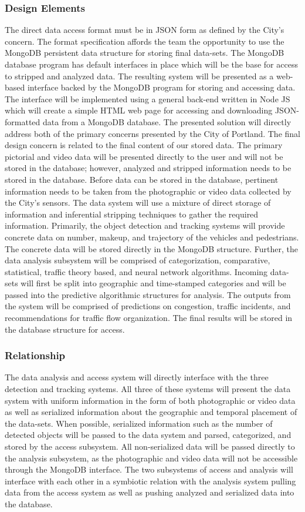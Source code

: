 \documentclass[onecolumn, draftclsnofoot,10pt, compsoc]{IEEEtran}
\begin{document}
\subsubsection{Design Elements}
The direct data access format must be in JSON form as defined by the City's concern. The format specification affords the team the opportunity to use the MongoDB persistent data structure for storing final data-sets. The MongoDB database program has default interfaces in place which will be the base for access to stripped and analyzed data. The resulting system will be presented as a web-based interface backed by the MongoDB program for storing and accessing data. The interface will be implemented using a general back-end written in Node JS which will create a simple HTML web page for accessing and downloading JSON-formatted data from a MongoDB database. The presented solution will directly address both of the primary concerns presented by the City of Portland. The final design concern is related to the final content of our stored data. The primary pictorial and video data will be presented directly to the user and will not be stored in the database; however, analyzed and stripped information needs to be stored in the database. Before data can be stored in the database, pertinent information needs to be taken from the photographic or video data collected by the City's sensors. The data system will use a mixture of direct storage of information and inferential stripping techniques to gather the required information. Primarily, the object detection and tracking systems will provide concrete data on number, makeup, and trajectory of the vehicles and pedestrians. The concrete data will be stored directly in the MongoDB structure. Further, the data analysis subsystem will be comprised of categorization, comparative, statistical, traffic theory based, and neural network algorithms. Incoming data-sets will first be split into geographic and time-stamped categories and will be passed into the predictive algorithmic structures for analysis. The outputs from the system will be comprised of predictions on congestion, traffic incidents, and recommendations for traffic flow organization. The final results will be stored in the database structure for access. 
\subsubsection{Relationship}
The data analysis and access system will directly interface with the three detection and tracking systems. All three of these systems will present the data system with uniform information in the form of both photographic or video data as well as serialized information about the geographic and temporal placement of the data-sets. When possible, serialized information such as the number of detected objects will be passed to the data system and parsed, categorized, and stored by the access subsystem. All non-serialized data will be passed directly to the analysis subsystem, as the photographic and video data will not be accessible through the MongoDB interface. The two subsystems of access and analysis will interface with each other in a symbiotic relation with the analysis system pulling data from the access system as well as pushing analyzed and serialized data into the database. 
\end{document}
